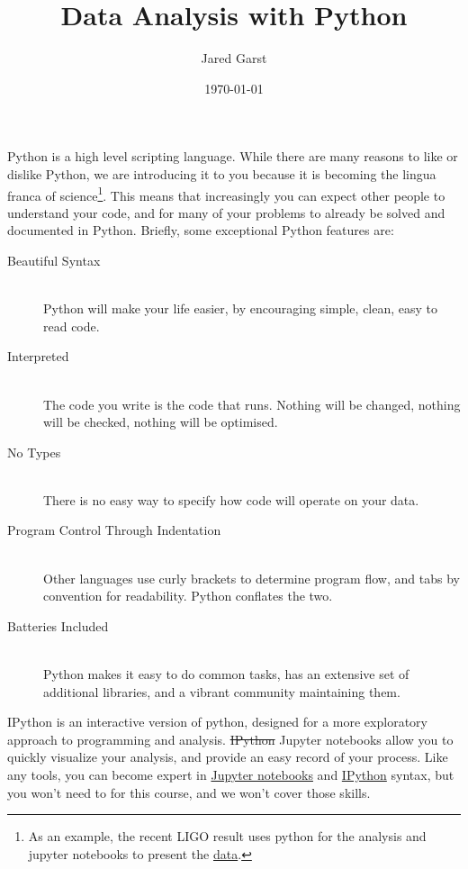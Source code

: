 \documentclass[justified, nobib]{tufte-handout}
\title{Data Analysis with Python}
\author{Jared Garst}
\date{\today} %
\newcommand{\ipythonTutorialLink}
  {http://ipython.readthedocs.org/en/stable/interactive/index.html}
\newcommand{\jupyterInfoLink}
  {http://jupyter-notebook.readthedocs.org/en/latest/notebook.html\#basic-workflow}
\begin{document}
\maketitle
\bigskip

\noindent
Python is a high level scripting language. While there are many reasons to like
or dislike Python, we are introducing it to you because it is becoming the
lingua franca of science\footnote{As an example, the recent LIGO result uses python for the analysis and jupyter notebooks to present the \href{https://losc.ligo.org/s/events/GW150914/GW150914_tutorial.html}{data}.}.
This means that increasingly you can expect other people to understand
your code, and for many of your problems to already be solved and documented in
Python. Briefly, some exceptional Python features are:

\begin{description}
\item[Beautiful Syntax] \hfill \\
  Python will make your life easier, by encouraging simple, clean, easy to read
  code.
\item[Interpreted] \hfill \\
  The code you write is the code that runs. Nothing will be changed, nothing
  will be checked, nothing will be optimised.
\item[No Types] \hfill \\
  There is no easy way to specify how code will operate on your data.
\item[Program Control Through Indentation] \hfill \\
  Other languages use curly brackets \ipythoninline{{}} to determine program
  flow, and tabs by convention for readability.
  Python conflates the two.
\item[Batteries Included] \hfill \\
  Python makes it easy to do common tasks, has an extensive set of additional
  libraries, and a vibrant community maintaining them.
\end{description}

\noindent
IPython is an interactive version of python, designed for a more exploratory
approach to programming and analysis.
\sout{IPython} Jupyter notebooks allow you to quickly visualize your analysis,
and provide an easy record of your process.
Like any tools, you can become expert in
\href{\jupyterInfoLink}{Jupyter notebooks} and
\href{\ipythonTutorialLink}{IPython} syntax, but you won't need to for this
course, and we won't cover those skills.
\end{document}
